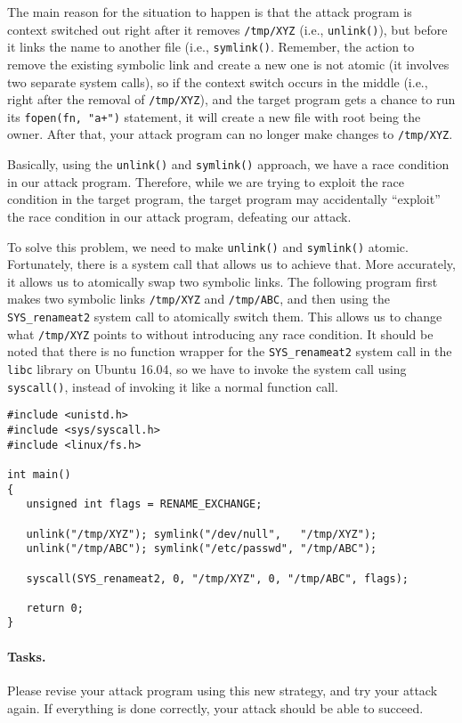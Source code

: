 The main reason for the situation to happen is that the attack program is 
context switched out right after it removes {\tt /tmp/XYZ} (i.e., \texttt{unlink()}),
but before it links the name to another file (i.e., \texttt{symlink()}. 
Remember, the action to remove the existing 
symbolic link and create a new one is not atomic (it involves two 
separate system calls), so if the context switch occurs in the middle
(i.e., right after the removal of {\tt /tmp/XYZ}),
and the target \setuid program gets a chance to run its 
{\tt fopen(fn, "a+")} statement, it will create a new file with root being the owner.
After that, your attack program can no longer make changes to {\tt /tmp/XYZ}.


Basically, using the \texttt{unlink()} and \texttt{symlink()} approach, 
we have a race condition in our attack program. Therefore, while we 
are trying to exploit the race condition in the target program,
the target program may accidentally ``exploit'' the race condition
in our attack program, defeating our attack.  


To solve this problem, we need to make 
\texttt{unlink()} and \texttt{symlink()} atomic. Fortunately, there 
is a system call that allows us to achieve that. More accurately,
it allows us to atomically swap two symbolic links. 
The following program first makes two symbolic links \texttt{/tmp/XYZ}
and \texttt{/tmp/ABC}, and then using the
\texttt{SYS\_renameat2} system call to atomically switch them. 
This allows us to change what \texttt{/tmp/XYZ} points to
without introducing any race condition. 
It should be noted that there is no function
wrapper for the \texttt{SYS\_renameat2} system call in the \texttt{libc} library
on Ubuntu 16.04, so we have to invoke the system call using 
\texttt{syscall()}, instead of invoking it like a normal function call. 


\begin{lstlisting}
#include <unistd.h>
#include <sys/syscall.h>
#include <linux/fs.h>

int main()
{
   unsigned int flags = RENAME_EXCHANGE;

   unlink("/tmp/XYZ"); symlink("/dev/null",   "/tmp/XYZ");
   unlink("/tmp/ABC"); symlink("/etc/passwd", "/tmp/ABC");

   syscall(SYS_renameat2, 0, "/tmp/XYZ", 0, "/tmp/ABC", flags);

   return 0;
}
\end{lstlisting}


\paragraph{Tasks.} Please revise your attack program using 
this new strategy, and try your attack again. If everything 
is done correctly, your attack should be able to succeed. 




